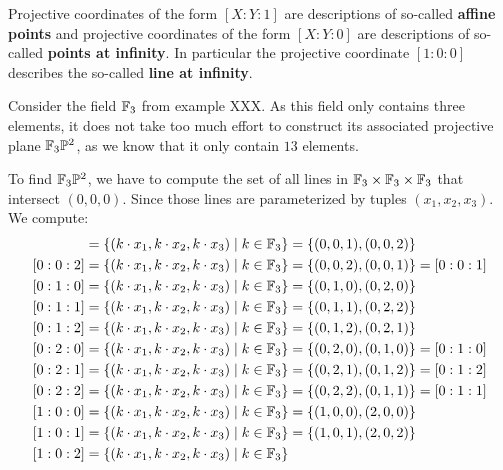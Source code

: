 \begin{notation}
Projective coordinates of the form $[X:Y:1]$ are descriptions of so-called \textbf{affine points} and projective coordinates of the form $[X:Y:0]$ are descriptions of so-called \textbf{points at infinity}. In particular the projective coordinate $[1:0:0]$ describes the so-called \textbf{line at infinity}.
\end{notation}
\begin{example} Consider the field $\mathbb{F}_3$ from example XXX. As this field only contains three elements, it does not take too much effort to construct its associated projective plane $\mathbb{F}_3\mathbb{P}^2$, as we know that it only contain $13$ elements.

To find $\mathbb{F}_3\mathbb{P}^2$, we have to compute the set of all lines in $\mathbb{F}_3\times \mathbb{F}_3\times \mathbb{F}_3$ that intersect $(0,0,0)$. Since those lines are parameterized by tuples $(x_1,x_2,x_3)$. We compute:
\begin{align*}
[0:0:1] &= \{(k\cdot x_1,k\cdot x_2, k\cdot x_3)\;|\; k\in\F_3\}
          = \{(0,0,1), (0,0,2)\}\\
[0:0:2] &= \{(k\cdot x_1,k\cdot x_2, k\cdot x_3)\;|\; k\in\F_3\}
          = \{(0,0,2), (0,0,1)\}
          = [0:0:1]\\
[0:1:0] &= \{(k\cdot x_1,k\cdot x_2, k\cdot x_3)\;|\; k\in\F_3\}
          = \{(0,1,0), (0,2,0)\}\\
[0:1:1] &= \{(k\cdot x_1,k\cdot x_2, k\cdot x_3)\;|\; k\in\F_3\}
          = \{(0,1,1), (0,2,2)\}\\
[0:1:2] &= \{(k\cdot x_1,k\cdot x_2, k\cdot x_3)\;|\; k\in\F_3\}
          = \{(0,1,2), (0,2,1)\}\\
[0:2:0] &= \{(k\cdot x_1,k\cdot x_2, k\cdot x_3)\;|\; k\in\F_3\}
          = \{(0,2,0), (0,1,0)\}
          = [0:1:0]\\
[0:2:1] &= \{(k\cdot x_1,k\cdot x_2, k\cdot x_3)\;|\; k\in\F_3\}
          = \{(0,2,1), (0,1,2)\}
          = [0:1:2]\\
[0:2:2] &= \{(k\cdot x_1,k\cdot x_2, k\cdot x_3)\;|\; k\in\F_3\}
          = \{(0,2,2), (0,1,1)\}
          = [0:1:1]\\
[1:0:0] &= \{(k\cdot x_1,k\cdot x_2, k\cdot x_3)\;|\; k\in\F_3\}
          = \{(1,0,0), (2,0,0)\}\\
[1:0:1] &= \{(k\cdot x_1,k\cdot x_2, k\cdot x_3)\;|\; k\in\F_3\}
          = \{(1,0,1), (2,0,2)\}\\
[1:0:2] &= \{(k\cdot x_1,k\cdot x_2, k\cdot x_3)\;|\; k\in\F_3\}

\end{align*}
\end{example}
